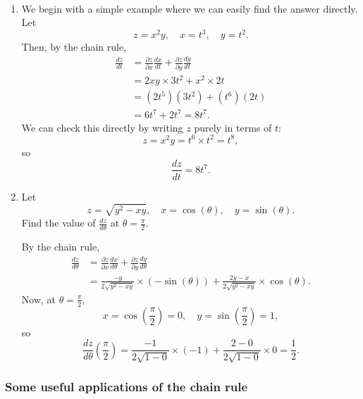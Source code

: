   \begin{examples} \
    \begin{enumerate}
      \item We begin with a simple example where we can easily find the answer directly.  Let
        \[
          z = x^2 y, \quad x = t^3, \quad y = t^2.
        \]
      Then, by the chain rule,
        \begin{align*}
          \frac{dz}{dt} & = \frac{\partial z}{\partial x}\frac{dx}{dt} + \frac{\partial z}{\partial y}\frac{dy}{dt}  \\
          & = 2xy \times 3t^2 + x^2 \times 2t  \\
          & = (2t^5)(3t^2) + (t^6)(2t)  \\
          & = 6t^7 + 2t^7 = 8t^7.
        \end{align*}
      We can check this directly by writing $z$ purely in terms of $t$:
        \[
          z = x^2 y = t^6 \times t^2 = t^8,
        \]
      so
        \[
          \frac{dz}{dt} = 8t^7.
        \]
      \item Let
        \[
          z = \sqrt{y^2 - xy}, \quad x = \cos(\theta), \quad y = \sin(\theta).
        \]
      Find the value of $\displaystyle \frac{dz}{d\theta}$ at $\displaystyle \theta = \frac{\pi}{2}$.

      By the chain rule,
        \begin{align*}
          \frac{dz}{d\theta} & = \frac{\partial z}{\partial x}\frac{dx}{d\theta} + \frac{\partial z}{\partial y}\frac{dy}{d\theta}  \\
          & = \frac{-y}{2\sqrt{y^2 - xy}} \times (-\sin(\theta)) + \frac{2y - x}{2\sqrt{y^2 - xy}} \times \cos(\theta).
        \end{align*}
      Now, at $\displaystyle \theta = \frac{\pi}{2}$,
        \[
          x = \cos\left(\frac{\pi}{2}\right) = 0, \quad y = \sin\left(\frac{\pi}{2}\right) = 1,
        \]
      so
        \[
          \frac{dz}{d\theta}\left(\frac{\pi}{2}\right) = \frac{-1}{2\sqrt{1 - 0}}\times(-1) + \frac{2 - 0}{2\sqrt{1 - 0}}\times 0 = \frac{1}{2}.
        \]
    \end{enumerate}
  \end{examples}

  \subsubsection*{Some useful applications of the chain rule}

